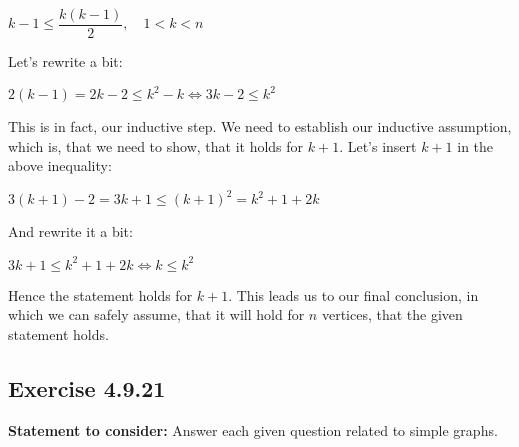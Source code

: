 \documentclass{report}
\newcommand{\cent}[1]{\begin{center}#1\end{center}}
\newcommand{\assignmentDescription}{\textbf{Statement to consider: }}
\newcommand{\Exercise}[1]{\subsection{Exercise #1}}
\begin{document}
	\cent{$k-1 \leq \dfrac{k(k-1)}{2}, \quad 1 < k < n$}
	
	Let's rewrite a bit:
	
	\cent{$2(k-1) = 2k-2 \leq k^2 - k \Leftrightarrow 3k-2 \leq k^2$}
	
	This is in fact, our inductive step. We need to establish our inductive assumption, which is, that we need to show, that it holds for $k+1$. Let's insert $k+1$ in the above inequality:
	
	\cent{$3(k+1)-2 = 3k+1 \leq (k+1)^2 = k^2 + 1 + 2k$}
	
	And rewrite it a bit:
	
	\cent{$3k+1 \leq  k^2 + 1 + 2k \Leftrightarrow k \leq k^2$}
	
	Hence the statement holds for $k+1$. This leads us to our final conclusion, in which we can safely assume, that it will hold for $n$ vertices, that the given statement holds.
	
	\Exercise{4.9.21}
	
	\assignmentDescription
	Answer each given question related to simple graphs.
	
\end{document}
